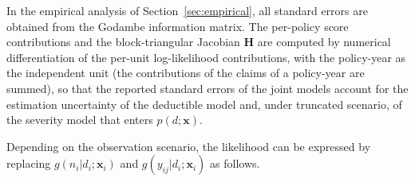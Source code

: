 \documentclass[11pt]{article}
\begin{document}
{In the empirical analysis of Section~\ref{sec:empirical}, all standard errors are obtained from the Godambe information matrix. The per-policy score contributions and the block-triangular Jacobian $\bm{H}$ are computed by numerical differentiation of the per-unit log-likelihood contributions, with the policy-year as the independent unit (the contributions of the claims of a policy-year are summed), so that the reported standard errors of the joint models account for the estimation uncertainty of the deductible model and, under truncated scenario, of the severity model that enters $p(d;\bm{x})$.}

Depending on the {observation scenario}, the likelihood can be expressed by replacing $g(n_{i}|d_i;\bm{x}_i)$ and $g(y_{ij}|d_i;\bm{x}_i)$ as follows.
\end{document}
